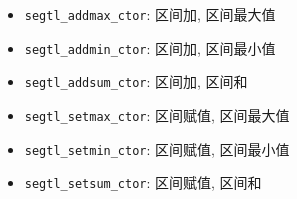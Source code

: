 \begin{itemize}
    \item \verb|segtl_addmax_ctor|: 区间加, 区间最大值
    \item \verb|segtl_addmin_ctor|: 区间加, 区间最小值
    \item \verb|segtl_addsum_ctor|: 区间加, 区间和
    \item \verb|segtl_setmax_ctor|: 区间赋值, 区间最大值
    \item \verb|segtl_setmin_ctor|: 区间赋值, 区间最小值
    \item \verb|segtl_setsum_ctor|: 区间赋值, 区间和
\end{itemize}